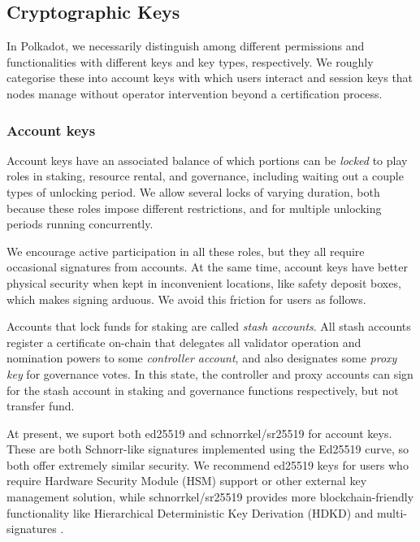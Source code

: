 \subsection{Cryptographic Keys}\label{sec:crypto}

In Polkadot, we necessarily distinguish among different permissions and functionalities with different keys and key types, respectively.  We roughly categorise these into account keys with which users interact and session keys that nodes manage without operator intervention beyond a certification process.

\subsubsection{Account keys}

Account keys have an associated balance of which portions can be {\em locked} to play roles in staking, resource rental, and governance, including waiting out a couple types of unlocking period.  We allow several locks of varying duration, both because these roles impose different restrictions, and for multiple unlocking periods running concurrently. 

We encourage active participation in all these roles, but they all require occasional signatures from accounts.  At the same time, account keys have better physical security when kept in inconvenient locations, like safety deposit boxes, which makes signing arduous.  We avoid this friction for users as follows.

Accounts that lock funds for staking are called {\em stash accounts}.  All stash accounts register a certificate on-chain that delegates all validator operation and nomination powers to some {\em controller account}, and also designates some {\em proxy key} for governance votes.  In this state, the controller and proxy accounts can sign for the stash account in staking and governance functions respectively, but not transfer fund.  

\smallskip

At present, we suport both ed25519 \cite{} and schnorrkel/sr25519 \cite{} for account keys.  These are both Schnorr-like signatures implemented using the Ed25519 curve, so both offer extremely similar security.  We recommend ed25519 keys for users who require Hardware Security Module (HSM) support or other external key management solution, while schnorrkel/sr25519 provides more blockchain-friendly functionality like Hierarchical Deterministic Key Derivation (HDKD) and multi-signatures \cite{}.  

